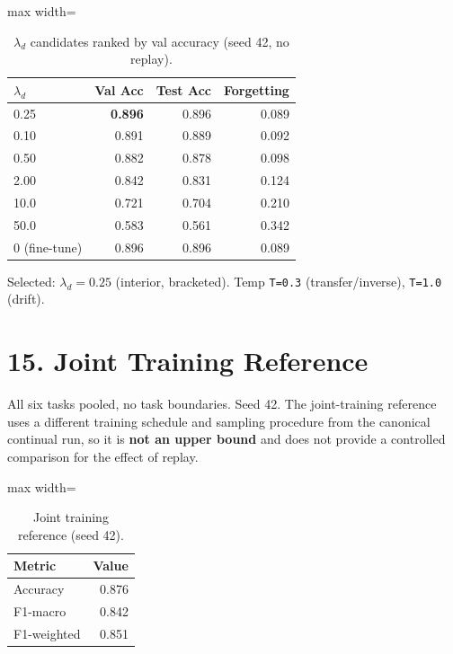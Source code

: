 \documentclass[11pt,a4paper]{article}
\begin{document}
\begin{table}[H]
\centering
\caption{$\lambda_d$ candidates ranked by val accuracy (seed 42, no replay).}
\label{tab:lambda-selection}
\begin{adjustbox}{max width=\textwidth}
\begin{tabular}{lrrr}
\toprule
$\lambda_d$ & Val Acc & Test Acc & Forgetting \\
\midrule
0.25 & \textbf{0.896} & 0.896 & 0.089 \\
0.10 & 0.891 & 0.889 & 0.092 \\
0.50 & 0.882 & 0.878 & 0.098 \\
2.00 & 0.842 & 0.831 & 0.124 \\
10.0 & 0.721 & 0.704 & 0.210 \\
50.0 & 0.583 & 0.561 & 0.342 \\
0 (fine-tune) & 0.896 & 0.896 & 0.089 \\
\bottomrule
\end{tabular}
\end{adjustbox}
\end{table}
Selected: $\lambda_d=\num{0.25}$ (interior, bracketed). Temp \texttt{T=0.3} (transfer/inverse), \texttt{T=1.0} (drift).

\section*{15. Joint Training Reference}
All six tasks pooled, no task boundaries. Seed 42. The joint-training reference uses a different training schedule and sampling procedure from the canonical continual run, so it is \textbf{not an upper bound} and does not provide a controlled comparison for the effect of replay.

\begin{table}[H]
\centering
\caption{Joint training reference (seed 42).}
\label{tab:joint}
\begin{adjustbox}{max width=\textwidth}
\begin{tabular}{lr}
\toprule
Metric & Value \\
\midrule
Accuracy & 0.876 \\
F1-macro & 0.842 \\
F1-weighted & 0.851 \\
\bottomrule
\end{tabular}
\end{adjustbox}
\end{table}
\end{document}
